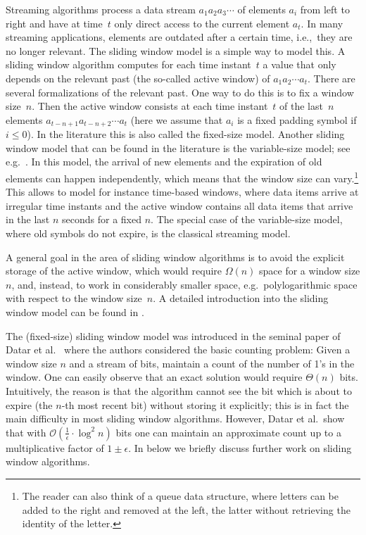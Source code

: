 \documentclass{article}\usepackage[a4paper,margin=20mm]{geometry}
\renewcommand{\O}{\mathcal{O}}
\renewcommand{\leq}{\leqslant}
\begin{document}
Streaming algorithms process a data stream $a_1 a_2 a_3 \cdots$
of elements $a_i$ from left to right and have at time~$t$ only direct access to the current element $a_t$.
In many streaming applications, elements are outdated after a certain time, i.e.,~they are no longer relevant.
The sliding window model is a simple way to model this.
A sliding window algorithm computes for each time instant~$t$ a value
that only depends on the relevant past (the so-called active window) of $a_1 a_2 \cdots a_t$. 
There are several formalizations of the relevant past. One way to do this is to fix a 
window size~$n$. Then the active window consists at each time instant~$t$ of the last~$n$
elements $a_{t-n+1} a_{t-n+2} \cdots a_t$ (here we assume that $a_i$ is a fixed padding symbol if $i \leq 0$). In the literature this is also called the fixed-size model.
Another sliding window model that can be found in the literature is the variable-size model; see e.g.~\cite{ArasuM04}.
In this model, the arrival of new elements and the expiration of old elements
can happen independently, which means that the window size can vary.\footnote{The reader can also think of a 
queue data structure, where letters can be added to the right and removed at the left, the latter without retrieving the identity of the letter.}
This allows to model for instance time-based windows, where data items arrive at irregular
time instants and the active window contains
all data items that arrive in the last $n$ seconds for a fixed $n$.
The special case of the variable-size model, where old symbols do not expire, is the classical
streaming model.

A general goal in the area of sliding window algorithms is to avoid the explicit storage
of the active window, which would require $\Omega(n)$ space for a window size $n$, and,
instead, to work in considerably smaller space,
e.g.~polylogarithmic space with respect to the window size~$n$.
A detailed introduction into the sliding window model can be found in \cite[Chapter~8]{Aggarwal07}.

The (fixed-size) sliding window model was introduced
in the seminal paper of Datar et al.~\cite{DatarGIM02}
where the authors considered the basic counting problem:
Given a window size $n$ and a stream of bits,
maintain a count of the number of 1’s in the window.
One can easily observe that an exact solution would require $\Theta(n)$ bits.
Intuitively, the reason is that the algorithm cannot see the bit which is
about to expire (the $n$-th most recent bit) without storing it explicitly; this is in fact the main difficulty
in most sliding window algorithms.
However, Datar et al.~show that with $\O(\frac{1}{\epsilon} \cdot \log^2 n)$ bits
one can maintain an approximate count up to a multiplicative factor of $1 \pm \epsilon$.
In  below we briefly discuss further work on sliding window
algorithms.
\end{document}
